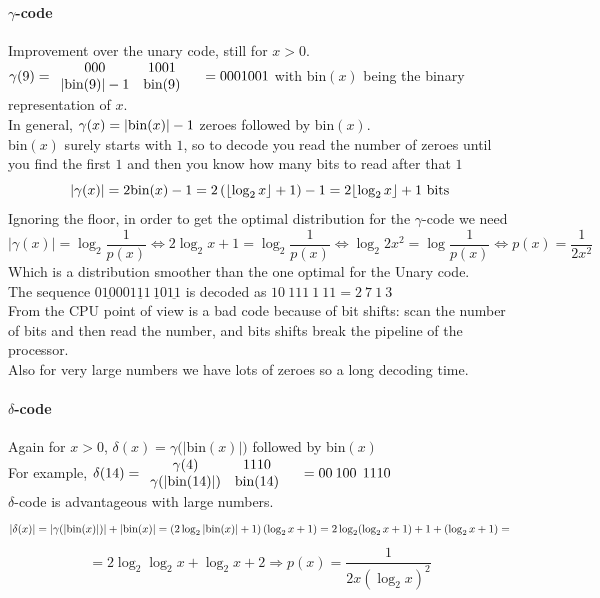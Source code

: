 \documentclass[10pt]{report}
\begin{document}
\paragraph{$\gamma$-code} Improvement over the unary code, still for $x > 0$.\\
$\gamma(9) = \begin{array}{c c c}
000 & 1001 & \\
|\hbox{bin(9)}|-1 & \hbox{bin(9)} &
\end{array} = 0001001$ with bin$(x)$ being the binary representation of $x$.\\
In general, $\gamma(x) = |\hbox{bin}(x)| - 1$ zeroes followed by bin$(x)$.\\
bin$(x)$ surely starts with $1$, so to decode you read the number of zeroes until you find the first $1$ and then you know how many bits to read after that $1$\\
$$|\gamma(x)| = 2\hbox{bin}(x) - 1 = 2\left(\lfloor\log_2 x\rfloor + 1\right) - 1 = 2\lfloor\log_2 x\rfloor + 1\hbox{ bits}$$
Ignoring the floor, in order to get the optimal distribution for the $\gamma$-code we need $$|\gamma(x)| = \log_2\frac{1}{p(x)} \Leftrightarrow 2\log_2 x + 1 = \log_2\frac{1}{p(x)} \Leftrightarrow \log_2 2x^2 = \log \frac{1}{p(x)} \Leftrightarrow p(x) = \frac{1}{2x^2}$$
Which is a distribution smoother than the one optimal for the Unary code.\\
The sequence $0\underline{10}00\underline{111}\,\underline{1}0\underline{11}$ is decoded as $10\:111\:1\:11 = 2\:7\:1\:3$\\
From the CPU point of view is a bad code because of bit shifts: scan the number of bits and then read the number, and bits shifts break the pipeline of the processor.\\
Also for very large numbers we have lots of zeroes so a long decoding time.

\paragraph{$\delta$-code} Again for $x>0$, $\delta(x) = \gamma(|$bin$(x)|)$ followed by bin$(x)$\\
For example, $\delta(14) = \begin{array}{c c c}
\gamma(4) & 1110 & \\
\gamma(|\hbox{bin(14)}|) & \hbox{bin(14)} &
\end{array} = 00\:100\:\:1110$\\
$\delta$-code is advantageous with large numbers.$$|\delta(x)| = |\gamma(|\hbox{bin}(x)|)| + |\hbox{bin}(x)| = \left(2\log_2 |\hbox{bin}(x)| + 1\right) \left(\log_2 x + 1\right) = 2\log_2(\log_2 x + 1) + 1 + (\log_2 x + 1)=$$
$$= 2\log_2\log_2 x + \log_2 x + 2 \Rightarrow p(x) = \frac{1}{2x(\log_2 x)^2}$$
\end{document}
